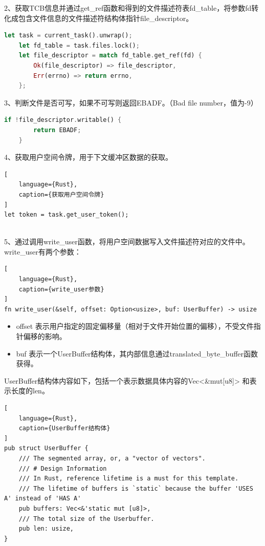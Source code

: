 2、获取TCB信息并通过get_ref函数和得到的文件描述符表fd_table，将参数fd转化成包含文件信息的文件描述符结构体指针file_descriptor。
\begin{lstlisting}[language={Rust},
    caption={含有文件信息文件描述符指针的获取}]
    let task = current_task().unwrap();
    let fd_table = task.files.lock();
    let file_descriptor = match fd_table.get_ref(fd) {
        Ok(file_descriptor) => file_descriptor,
        Err(errno) => return errno,
    };
\end{lstlisting}

3、判断文件是否可写，如果不可写则返回EBADF。（Bad file number，值为-9）
\begin{lstlisting}[language={Rust},
    caption={文件权限判断}]
    if !file_descriptor.writable() {
        return EBADF;
    }
\end{lstlisting}

4、获取用户空间令牌，用于下文缓冲区数据的获取。

\begin{lstlisting}[
    language={Rust},
    caption={获取用户空间令牌}
]
let token = task.get_user_token();
    
\end{lstlisting}

5、通过调用write_user函数，将用户空间数据写入文件描述符对应的文件中。
write_user有两个参数：
\begin{lstlisting}[
    language={Rust},
    caption={write_user参数}
]
fn write_user(&self, offset: Option<usize>, buf: UserBuffer) -> usize
\end{lstlisting}
\begin{itemize}
    \item offset 表示用户指定的固定偏移量（相对于文件开始位置的偏移），不受文件指针偏移的影响。
    \item buf 表示一个UserBuffer结构体，其内部信息通过translated_byte_buffer函数获得。
\end{itemize}
    UserBuffer结构体内容如下，包括一个表示数据具体内容的Vec<\&mut[u8]> 和表示长度的len。
\begin{lstlisting}[
    language={Rust},
    caption={UserBuffer结构体}
]
pub struct UserBuffer {
    /// The segmented array, or, a "vector of vectors".
    /// # Design Information
    /// In Rust, reference lifetime is a must for this template.
    /// The lifetime of buffers is `static` because the buffer 'USES A' instead of 'HAS A'
    pub buffers: Vec<&'static mut [u8]>,
    /// The total size of the Userbuffer.
    pub len: usize,
}
    
\end{lstlisting}

